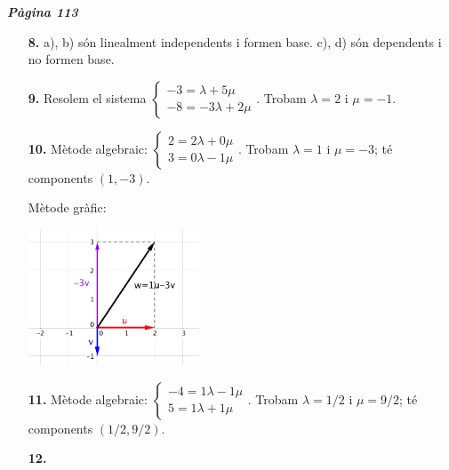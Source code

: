 \documentclass[a4paper, pdf, twoside]{book}
\begin{document}
\begin{multicols}{2}

{\textbf{\em Pàgina 113}} \hrulefill
\begin{enumerate}
\vspace{0.25cm}
\item[\fontfamily{phv}\selectfont\color{blue}\textbf{8. }] 
a), b) són linealment independents i formen base. c), d) són dependents i no formen base.
 \end{enumerate}
\begin{enumerate}
\vspace{0.25cm}
\item[\fontfamily{phv}\selectfont\color{blue}\textbf{9. }] 
Resolem el sistema $\left \{ \begin {array}{l} -3 = \lambda + 5\mu \\ -8=-3\lambda +2\mu \end {array} \right .$. Trobam $\lambda =2$ i $\mu =-1$.
\vspace{0.25cm}
\item[\fontfamily{phv}\selectfont\color{blue}\textbf{10. }] 
Mètode algebraic: $\left \{ \begin {array}{l} 2= 2\lambda + 0\mu \\ 3=0\lambda -1\mu \end {array} \right .$. Trobam $\lambda =1$ i $\mu =-3$; té components $(1,-3)$.\par Mètode gràfic:\par \includegraphics [width=0.4\textwidth ]{img-sol/t8-10}
\vspace{0.25cm}
\item[\fontfamily{phv}\selectfont\color{blue}\textbf{11. }] 
Mètode algebraic: $\left \{ \begin {array}{l} -4= 1\lambda -1\mu \\ 5=1\lambda +1\mu \end {array} \right .$. Trobam $\lambda =1/2$ i $\mu =9/2$; té components $(1/2, 9/2)$.
\vspace{0.25cm}
\item[\fontfamily{phv}\selectfont\color{blue}\textbf{12. }] 

\end{enumerate}
\end{multicols}
\end{document}
